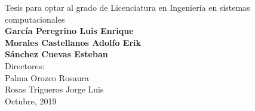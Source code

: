\begin{center}
\begin{large}
        \vspace{1cm}
    \end{large}
    \begin{large}
        Tesis para optar al grado de Licenciatura en Ingeniería en sistemas computacionales\\
        \vspace{.5cm}
        \textbf{García Peregrino Luis Enrique\\
        Morales Castellanos Adolfo Erik\\
        Sánchez Cuevas Esteban}\\
        \vspace{.5cm}
        Directores:\\ Palma Orozco Rosaura\\ Rosas Trigueros Jorge Luis\\ %
        \vspace{0.5cm}
        Octubre, 2019 %
    \end{large}
\end{center}
